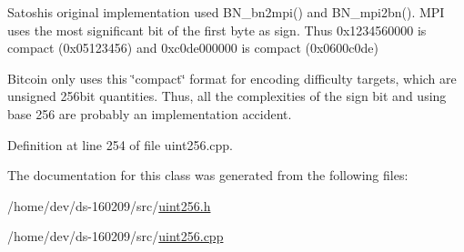 Satoshi\textquotesingle{}s original implementation used B\+N\+\_\+bn2mpi() and B\+N\+\_\+mpi2bn(). M\+P\+I uses the most significant bit of the first byte as sign. Thus 0x1234560000 is compact (0x05123456) and 0xc0de000000 is compact (0x0600c0de)

Bitcoin only uses this \char`\"{}compact\char`\"{} format for encoding difficulty targets, which are unsigned 256bit quantities. Thus, all the complexities of the sign bit and using base 256 are probably an implementation accident. 

Definition at line 254 of file uint256.\+cpp.



The documentation for this class was generated from the following files\+:\begin{DoxyCompactItemize}
\item 
/home/dev/ds-\/160209/src/\hyperlink{uint256_8h}{uint256.\+h}\item 
/home/dev/ds-\/160209/src/\hyperlink{uint256_8cpp}{uint256.\+cpp}\end{DoxyCompactItemize}
